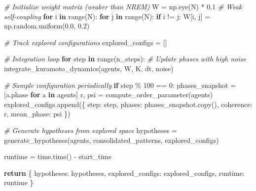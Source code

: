 \documentclass[
]{article}
\newenvironment{Shaded}{}{}
\newcommand{\BuiltInTok}[1]{\textcolor[rgb]{0.00,0.50,0.00}{#1}}
\newcommand{\CommentTok}[1]{\textcolor[rgb]{0.38,0.63,0.69}{\textit{#1}}}
\newcommand{\ControlFlowTok}[1]{\textcolor[rgb]{0.00,0.44,0.13}{\textbf{#1}}}
\newcommand{\DecValTok}[1]{\textcolor[rgb]{0.25,0.63,0.44}{#1}}
\newcommand{\FloatTok}[1]{\textcolor[rgb]{0.25,0.63,0.44}{#1}}
\newcommand{\KeywordTok}[1]{\textcolor[rgb]{0.00,0.44,0.13}{\textbf{#1}}}
\newcommand{\NormalTok}[1]{#1}
\newcommand{\OperatorTok}[1]{\textcolor[rgb]{0.40,0.40,0.40}{#1}}
\newcommand{\StringTok}[1]{\textcolor[rgb]{0.25,0.44,0.63}{#1}}
\begin{document}
\begin{Shaded}
\begin{Highlighting}[]
    \CommentTok{\# Initialize weight matrix (weaker than NREM)}
\NormalTok{    W }\OperatorTok{=}\NormalTok{ np.eye(N) }\OperatorTok{*} \FloatTok{0.1}  \CommentTok{\# Weak self{-}coupling}
    \ControlFlowTok{for}\NormalTok{ i }\KeywordTok{in} \BuiltInTok{range}\NormalTok{(N):}
        \ControlFlowTok{for}\NormalTok{ j }\KeywordTok{in} \BuiltInTok{range}\NormalTok{(N):}
            \ControlFlowTok{if}\NormalTok{ i }\OperatorTok{!=}\NormalTok{ j:}
\NormalTok{                W[i, j] }\OperatorTok{=}\NormalTok{ np.random.uniform(}\FloatTok{0.0}\NormalTok{, }\FloatTok{0.2}\NormalTok{)}

    \CommentTok{\# Track explored configurations}
\NormalTok{    explored\_configs }\OperatorTok{=}\NormalTok{ []}

    \CommentTok{\# Integration loop}
    \ControlFlowTok{for}\NormalTok{ step }\KeywordTok{in} \BuiltInTok{range}\NormalTok{(n\_steps):}
        \CommentTok{\# Update phases with high noise}
\NormalTok{        integrate\_kuramoto\_dynamics(agents, W, K, dt, noise)}

        \CommentTok{\# Sample configuration periodically}
        \ControlFlowTok{if}\NormalTok{ step }\OperatorTok{\%} \DecValTok{100} \OperatorTok{==} \DecValTok{0}\NormalTok{:}
\NormalTok{            phases\_snapshot }\OperatorTok{=}\NormalTok{ [a.phase }\ControlFlowTok{for}\NormalTok{ a }\KeywordTok{in}\NormalTok{ agents]}
\NormalTok{            r, psi }\OperatorTok{=}\NormalTok{ compute\_order\_parameter(agents)}
\NormalTok{            explored\_configs.append(\{}
                \StringTok{\textquotesingle{}step\textquotesingle{}}\NormalTok{: step,}
                \StringTok{\textquotesingle{}phases\textquotesingle{}}\NormalTok{: phases\_snapshot.copy(),}
                \StringTok{\textquotesingle{}coherence\textquotesingle{}}\NormalTok{: r,}
                \StringTok{\textquotesingle{}mean\_phase\textquotesingle{}}\NormalTok{: psi}
\NormalTok{            \})}

    \CommentTok{\# Generate hypotheses from explored space}
\NormalTok{    hypotheses }\OperatorTok{=}\NormalTok{ generate\_hypotheses(agents, consolidated\_patterns, explored\_configs)}

\NormalTok{    runtime }\OperatorTok{=}\NormalTok{ time.time() }\OperatorTok{{-}}\NormalTok{ start\_time}

    \ControlFlowTok{return}\NormalTok{ \{}
        \StringTok{\textquotesingle{}hypotheses\textquotesingle{}}\NormalTok{: hypotheses,}
        \StringTok{\textquotesingle{}explored\_configs\textquotesingle{}}\NormalTok{: explored\_configs,}
        \StringTok{\textquotesingle{}runtime\textquotesingle{}}\NormalTok{: runtime}
\NormalTok{    \}}



\end{Highlighting}
\end{Shaded}
\end{document}
